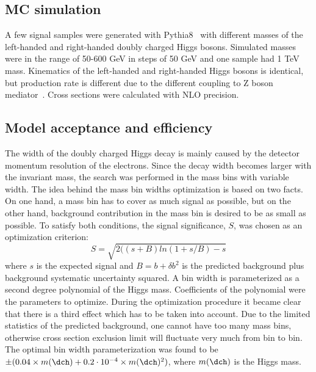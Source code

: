 \subsection{MC simulation}
A few signal samples were generated with Pythia8~\cite{pythia8} with different masses of the left-handed and right-handed doubly charged Higgs bosons.
Simulated masses were in the range of 50-600 GeV in steps of 50 GeV and one sample had 1 TeV mass.
Kinematics of the left-handed and right-handed Higgs bosons is identical, but production rate is different due to the different coupling to Z boson mediator~\cite{dch_note}. Cross sections were calculated with NLO precision. 

\subsection{Model acceptance and efficiency}
The width of the doubly charged Higgs decay is mainly caused by the detector momentum resolution of the electrons.
Since the decay width becomes larger with the invariant mass, the search was performed in the mass bins with variable width.
The idea behind the mass bin widths optimization is based on two facts. On one hand, a mass bin has to cover as much signal as possible,
but on the other hand, background contribution in the mass bin is desired to be as small as possible.
To satisfy both conditions, the signal significance, $S$, was chosen as an optimization criterion:
\begin{equation}
 S = \sqrt{ 2((s+B)ln(1+s/B)-s } 
\end{equation}
where $s$ is the expected signal and $B=b+\delta b^2$ is the predicted background plus background systematic uncertainty squared.
A bin width is parameterized as a second degree polynomial of the Higgs mass.
Coefficients of the polynomial were the parameters to optimize.
During the optimization procedure it became clear that there is a third effect which has to be taken into account.
Due to the limited statistics of the predicted background, one cannot have too many mass bins, otherwise cross section
exclusion limit will fluctuate very much from bin to bin. 
The optimal bin width parameterization was found to be $\pm(0.04 \times m(\dch) + 0.2 \cdot 10^{-4} \times m(\dch)^{2})$,
where $m(\dch)$ is the Higgs mass.

